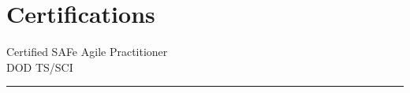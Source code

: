 \documentclass[letterpaper]{deedy-resume}
\begin{document}
\begin{minipage}[t]{0.3\textwidth}
\section{Certifications}

\vspace{1em}

\textbullet{} Certified SAFe\textregistered{} Agile Practitioner\\
\textbullet{} DOD TS/SCI
\sectionspace
\vspace{-1ex}
\rule{5cm}{0.5pt}

\end{minipage} %
\hfill
\vrule
\hspace{3ex}
%
%
\end{document}
